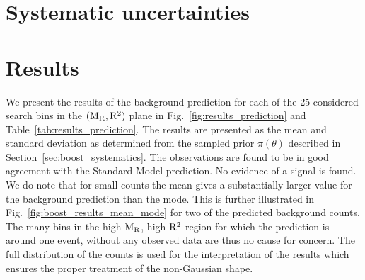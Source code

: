 



\section{Systematic uncertainties \label{sec:boost_systematics}}





\section{Results \label{sec:boost_results}}

We present the results of the background prediction for each of the 25 considered search bins in the
$(\mathrm{M_R},\mathrm{R^2})$ plane in Fig.~\ref{fig:results_prediction} and Table~\ref{tab:results_prediction}. The
results are presented as the mean and standard deviation as determined from the sampled prior
$\pi(\theta)$ described in Section~\ref{sec:boost_systematics}.  
The observations are found to be in good agreement with the Standard Model prediction. 
No evidence of a signal is found.
We do note that for small counts the mean gives a substantially larger value for the background
prediction than the mode. This is further illustrated in Fig.~\ref{fig:boost_results_mean_mode} for
two of the predicted background counts. 
The many bins in the high $\mathrm{M_R}$, high $\mathrm{R^2}$ region for which the prediction is around one event,
without any observed data are thus no cause for concern.
The full distribution of the counts is used for the interpretation of the results which
ensures the proper treatment of the non-Gaussian shape.

